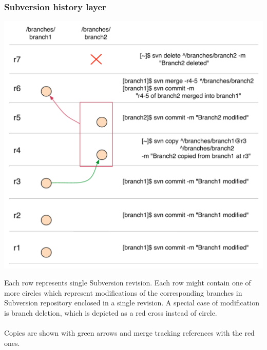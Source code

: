 \subsubsection{Subversion history layer}
\begin{center}
\includegraphics[width=\textwidth]{img/legend/svn_layer.pdf}%
\label{svn_layer}%
\end{center}
Each row represents single Subversion revision. Each row might contain one of more circles which represent
modifications of the corresponding branches in Subversion repository enclosed in a single revision. A special
case of modification is branch deletion, which is depicted as a red cross instead of circle.\\\\
Copies are shown with green arrows and merge tracking references with the red ones.

